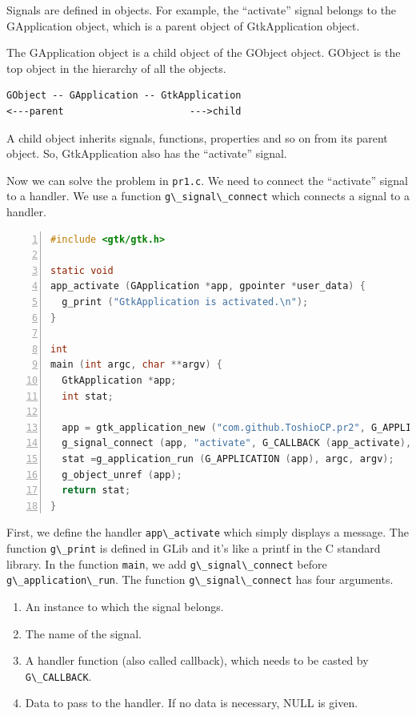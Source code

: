 Signals are defined in objects. For example, the ``activate'' signal
belongs to the GApplication object, which is a parent object of
GtkApplication object.

The GApplication object is a child object of the GObject object. GObject
is the top object in the hierarchy of all the objects.

\begin{lstlisting}
GObject -- GApplication -- GtkApplication
<---parent                      --->child
\end{lstlisting}

A child object inherits signals, functions, properties and so on from
its parent object. So, GtkApplication also has the ``activate'' signal.

Now we can solve the problem in \passthrough{\lstinline!pr1.c!}. We need
to connect the ``activate'' signal to a handler. We use a function
\passthrough{\lstinline!g\_signal\_connect!} which connects a signal to
a handler.

\begin{lstlisting}[language=C, numbers=left]
#include <gtk/gtk.h>

static void
app_activate (GApplication *app, gpointer *user_data) {
  g_print ("GtkApplication is activated.\n");
}

int
main (int argc, char **argv) {
  GtkApplication *app;
  int stat;

  app = gtk_application_new ("com.github.ToshioCP.pr2", G_APPLICATION_DEFAULT_FLAGS);
  g_signal_connect (app, "activate", G_CALLBACK (app_activate), NULL);
  stat =g_application_run (G_APPLICATION (app), argc, argv);
  g_object_unref (app);
  return stat;
}
\end{lstlisting}

First, we define the handler \passthrough{\lstinline!app\_activate!}
which simply displays a message. The function
\passthrough{\lstinline!g\_print!} is defined in GLib and it's like a
printf in the C standard library. In the function
\passthrough{\lstinline!main!}, we add
\passthrough{\lstinline!g\_signal\_connect!} before
\passthrough{\lstinline!g\_application\_run!}. The function
\passthrough{\lstinline!g\_signal\_connect!} has four arguments.

\begin{enumerate}
\def\labelenumi{\arabic{enumi}.}
\tightlist
\item
  An instance to which the signal belongs.
\item
  The name of the signal.
\item
  A handler function (also called callback), which needs to be casted by
  \passthrough{\lstinline!G\_CALLBACK!}.
\item
  Data to pass to the handler. If no data is necessary, NULL is given.
\end{enumerate}

